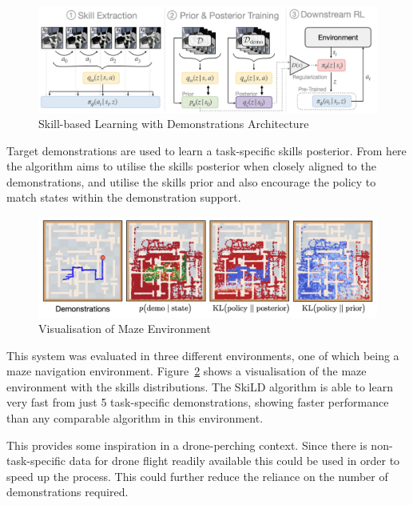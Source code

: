 \begin{figure}[htbp]
  \centering
  \includegraphics[width=\textwidth]{background/fyp15-skild-architecture.png}
  \caption{Skill-based Learning with Demonstrations Architecture}
\label{fig:fyp15-skild}
\end{figure}

Target demonstrations are used to learn a task-specific skills posterior.
From here the algorithm aims to utilise the skills posterior when closely aligned to the demonstrations, and utilise the skills prior and also encourage the policy to match states within the demonstration support.

\begin{figure}[htbp]
  \centering
  \includegraphics[width=\textwidth]{background/fyp15-maze-diagram.png}
  \caption{Visualisation of Maze Environment}
\label{fig:fyp15-maze}
\end{figure}

This system was evaluated in three different environments, one of which being a maze navigation environment.
Figure~\ref{fig:fyp15-maze} shows a visualisation of the maze environment with the skills distributions.
The SkiLD algorithm is able to learn very fast from just 5 task-specific demonstrations, showing faster performance than any comparable algorithm in this environment.

This provides some inspiration in a drone-perching context.
Since there is non-task-specific data for drone flight readily available this could be used in order to speed up the process.
This could further reduce the reliance on the number of demonstrations required.